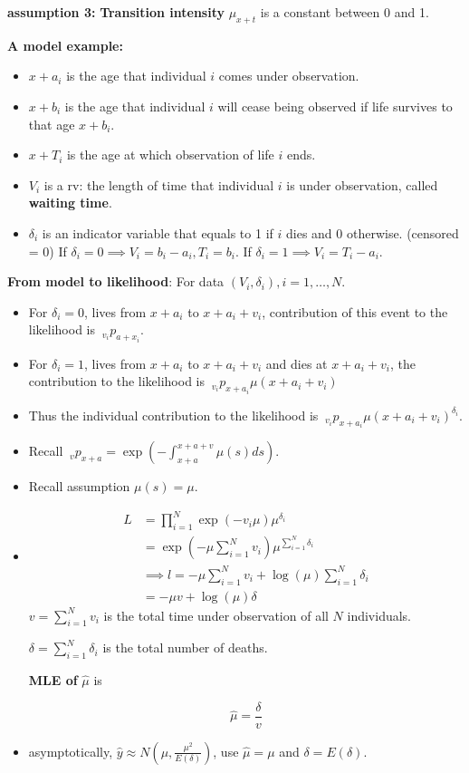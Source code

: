 \documentclass[a4paper]{article}
\begin{document}
\textbf{assumption 3:} \textbf{Transition intensity} $\mu_{x+t}$ is a constant between 0 and 1.

\textbf{A model example:}
\begin{itemize}
	\item $x+a_i$ is the age that individual $i$ comes under observation.
	\item $x+b_i$ is the age that individual $i$ will cease being observed if life survives to that age $x+b_i$.
	\item $x+T_i$ is the age at which observation of life $i$ ends.
	\item $V_i$ is a rv: the length of time that individual $i$ is under observation, called \textbf{waiting time}.
	\item $\delta_i$ is an indicator variable that equals to 1 if $i$ dies and $0$ otherwise. (censored = 0) If $\delta_i=0\implies V_i=b_i-a_i, T_i=b_i$. If $\delta_i=1\implies V_i=T_i-a_i.$
\end{itemize}

\textbf{From model to likelihood}: For data $(V_i,\delta_i), i=1,\dots, N$.\begin{itemize}
	\item For $\delta_i=0$, lives from $x+a_i$ to $x+a_i+v_i$, contribution of this event to the likelihood is $\ _{v_i}p_{a+x_i}$.
	\item For $\delta_i=1$, lives from $x+a_i$ to $x+a_i+v_i$ and dies at $x+a_i+v_i$, the contribution to the likelihood is $\ _{v_i}p_{x+a_i}\mu(x+a_i+v_i)$
	\item Thus the individual contribution to the likelihood is $\ _{v_i}p_{x+a_i}\mu(x+a_i+v_i)^{\delta_i}.$
	\item Recall $\ _{v}p_{x+a}=\exp(-\int^{x+a+v}_{x+a}\mu(s)ds)$.
	\item Recall assumption $\mu(s)=\mu$.
	\item \begin{equation}
		\begin{split}
			L&=\prod^N_{i=1}\exp(-v_i\mu)\mu^{\delta_i}\\
			&=\exp(-\mu\sum^N_{i=1}v_i)\mu^{\sum^{N}_{i=1}\delta_i}\\
			&\implies l =-\mu\sum^N_{i=1}v_i+\log(\mu)\sum^N_{i=1}\delta_i\\
			&=-\mu v+\log(\mu)\delta
		\end{split}
	\end{equation}
	$v=\sum^N_{i=1}v_i$ is the total time under observation of all $N$ individuals.
	
	$\delta=\sum^N_{i=1}\delta_i$ is the total number of deaths.
	
	\textbf{MLE of }$\hat{\mu}$ is 
	
	$$\hat{\mu}=\frac{\delta}{v}$$
	\item asymptotically, $\hat{y}\approx N(\mu,\frac{\mu^2}{E(\delta)})$, use $\hat{\mu}=\mu$ and $\delta=E(\delta)$.
\end{itemize}
\end{document}
